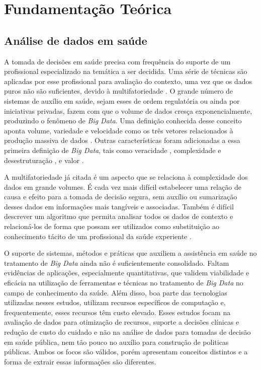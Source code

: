 
\chapter{Fundamentação Teórica}
\label{chap:fundamentacaoTeorica}

\section{Análise de dados em saúde}

A tomada de decisões em saúde precisa com frequência do suporte de um profissional especializado na temática a ser decidida. Uma série de técnicas são aplicadas por esse profissional para avaliação do contexto, uma vez que os dados puros não são suficientes, devido à multifatoriedade \cite{andrade_tomada_2008,resende2009}. O grande número de sistemas de auxílio em saúde, sejam esses de ordem regulatória ou ainda por iniciativas privadas, fazem com que o volume de dados cresça exponencialmente, produzindo o fenômeno de \emph{Big Data}. Uma definição conhecida desse conceito aponta volume, variedade e velocidade como os três vetores relacionados à produção massiva de dados \cite{laney20013d}. Outras características foram adicionadas a essa primeira definição de \emph{Big Data}, tais como veracidade \cite{schroeck2012analytics},  complexidade e desestruturação \cite{intel2012}, e valor \cite{oracle2013}.

A multifatoriedade já citada é um aspecto que se relaciona à complexidade dos dados em grande volumes. É cada vez mais difícil estabelecer uma relação de causa e efeito para a tomada de decisão segura, sem auxílio ou sumarização desses dados em informações mais tangíveis e associadas. Também é difícil descrever um algoritmo que permita analisar todos os dados de contexto e relacioná-los de forma que possam ser utilizados como substituição ao conhecimento tácito de um profissional da saúde experiente \cite{faceli2011}.

O suporte de sistemas, métodos e práticas que auxiliem a assistência em saúde no tratamento de \emph{Big Data}  ainda não é suficientemente consolidado. Faltam evidências de aplicações, especialmente quantitativas, que validem viabilidade e eficácia na utilização de ferramentas e técnicas no tratamento de \emph{Big Data} no campo de conhecimento da saúde. Além disso, boa parte das tecnologias utilizadas nesses estudos, utilizam recursos específicos de computação e, frequentemente, esses recursos têm custo elevado. Esses estudos focam na  avaliação de dados para otimização de recursos, suporte a decisões clínicas e redução de custo do cuidado \cite{nishita2018} e não na análise de dados para tomadas de decisão em saúde pública, nem tão pouco no auxílio para construção de politicas públicas. Ambos os focos são válidos, porém apresentam conceitos distintos e a forma de extrair essas informações são diferentes.

